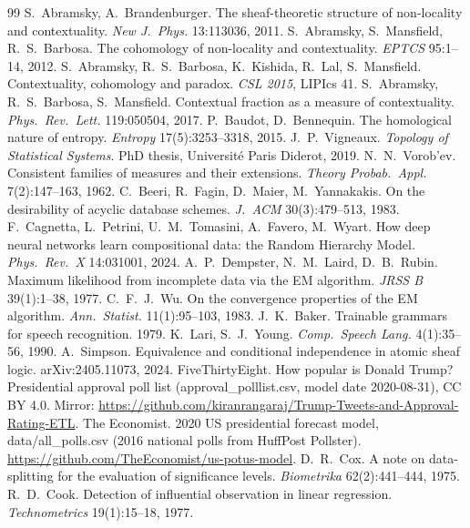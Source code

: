 \documentclass[11pt]{article}
\theoremstyle{definition}
\theoremstyle{remark}
\begin{document}
\begin{thebibliography}{99}\small
{} S.~Abramsky, A.~Brandenburger. The sheaf-theoretic structure of non-locality and contextuality. \emph{New J.\ Phys.} 13:113036, 2011.
 S.~Abramsky, S.~Mansfield, R.~S.~Barbosa. The cohomology of non-locality and contextuality. \emph{EPTCS} 95:1--14, 2012.
 S.~Abramsky, R.~S.~Barbosa, K.~Kishida, R.~Lal, S.~Mansfield. Contextuality, cohomology and paradox. \emph{CSL 2015}, LIPIcs 41.
 S.~Abramsky, R.~S.~Barbosa, S.~Mansfield. Contextual fraction as a measure of contextuality. \emph{Phys.\ Rev.\ Lett.} 119:050504, 2017.
 P.~Baudot, D.~Bennequin. The homological nature of entropy. \emph{Entropy} 17(5):3253--3318, 2015.
 J.~P.~Vigneaux. \emph{Topology of Statistical Systems}. PhD thesis, Universit\'e Paris Diderot, 2019.
 N.~N.~Vorob'ev. Consistent families of measures and their extensions. \emph{Theory Probab.\ Appl.} 7(2):147--163, 1962.
 C.~Beeri, R.~Fagin, D.~Maier, M.~Yannakakis. On the desirability of acyclic database schemes. \emph{J.\ ACM} 30(3):479--513, 1983.
 F.~Cagnetta, L.~Petrini, U.~M.~Tomasini, A.~Favero, M.~Wyart. How deep neural networks learn compositional data: the Random Hierarchy Model. \emph{Phys.\ Rev.\ X} 14:031001, 2024.
 A.~P.~Dempster, N.~M.~Laird, D.~B.~Rubin. Maximum likelihood from incomplete data via the EM algorithm. \emph{JRSS B} 39(1):1--38, 1977.
 C.~F.~J.~Wu. On the convergence properties of the EM algorithm. \emph{Ann.\ Statist.} 11(1):95--103, 1983.
 J.~K.~Baker. Trainable grammars for speech recognition. 1979. \quad K.~Lari, S.~J.~Young. \emph{Comp.\ Speech Lang.} 4(1):35--56, 1990.
 A.~Simpson. Equivalence and conditional independence in atomic sheaf logic. arXiv:2405.11073, 2024.
 FiveThirtyEight. How popular is Donald Trump? Presidential approval poll list (approval\_polllist.csv, model date 2020-08-31), CC BY 4.0. Mirror: \url{https://github.com/kiranrangaraj/Trump-Tweets-and-Approval-Rating-ETL}.
 The Economist. 2020 US presidential forecast model, data/all\_polls.csv (2016 national polls from HuffPost Pollster). \url{https://github.com/TheEconomist/us-potus-model}.
 D.~R.~Cox. A note on data-splitting for the evaluation of significance levels. \emph{Biometrika} 62(2):441--444, 1975.
 R.~D.~Cook. Detection of influential observation in linear regression. \emph{Technometrics} 19(1):15--18, 1977.

\end{thebibliography}
\end{document}
